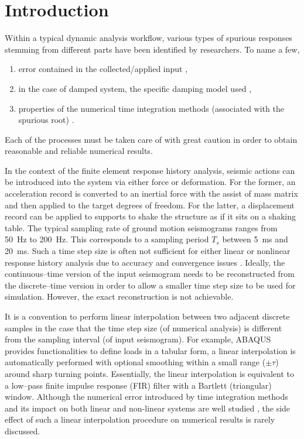 \section{Introduction}
Within a typical dynamic analysis workflow, various types of spurious responses stemming from different parts have been identified by researchers. To name a few,
\begin{enumerate}
\item error contained in the collected/applied input \citep{Shing1987},
\item in the case of damped system, the specific damping model used \citep{Hall2006,Jehel2014,Chopra2015},
\item properties of the numerical time integration methods (associated with the spurious root) \citep{Hulbert1994}.
\end{enumerate}
Each of the processes must be taken care of with great caution in order to obtain reasonable and reliable numerical results.

In the context of the finite element response history analysis, seismic actions can be introduced into the system via either force or deformation. For the former, an acceleration record is converted to an inertial force with the assist of mass matrix and then applied to the target degrees of freedom. For the latter, a displacement record can be applied to supports to shake the structure as if it sits on a shaking table.
The typical sampling rate of ground motion seismograms ranges from \SI{50}{\hertz} to \SI{200}{\hertz}. This corresponds to a sampling period $T_s$ between \SI{5}{\milli\second} and \SI{20}{\milli\second}. Such a time step size is often not sufficient for either linear or nonlinear response history analysis due to accuracy and convergence issues \citep[see, e.g.,][]{Chang2011,Rossi2014}. Ideally, the continuous--time version of the input seismogram needs to be reconstructed from the discrete--time version in order to allow a smaller time step size to be used for simulation. However, the exact reconstruction is not achievable.

It is a convention to perform linear interpolation between two adjacent discrete samples in the case that the time step size (of numerical analysis) is different from the sampling interval (of input seismogram). For example, ABAQUS \citep[see][\S34.1.2]{ABAQUS2014} provides functionalities to define loads in a tabular form, a linear interpolation is automatically performed with optional smoothing within a small range ($\pm\tau$) around sharp turning points. Essentially, the linear interpolation is equivalent to a low--pass finite impulse response (FIR) filter with a Bartlett (triangular) window. Although the numerical error introduced by time integration methods and its impact on both linear and non-linear systems are well studied \citep[see, e.g.,][]{Chang2003,Chang2005}, the side effect of such a linear interpolation procedure on numerical results is rarely discussed.

